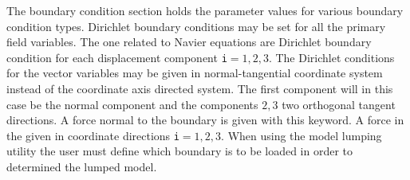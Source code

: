 The boundary condition section holds the parameter values for various
boundary condition types. Dirichlet boundary conditions may be
set for all the primary field variables. The one related to Navier equations
are
\sifbegin
{} 
Dirichlet boundary condition
for each displacement component {\tt i}$=1,2,3$.
The Dirichlet conditions for the vector variables may be given in normal-tangential
coordinate system instead of the coordinate axis directed system. The first component
will in this case be the normal component and the components $2,3$ two orthogonal
tangent directions.
A force normal to the boundary is given with this keyword.
A  force in the given in coordinate directions {\tt i}$=1,2,3$.
When using the model lumping utility the user must define
which boundary is to be loaded in order to determined the 
lumped model. 
\sifend
\sifend




